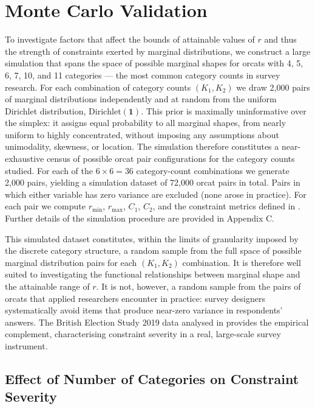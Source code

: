 \documentclass[
  12pt,
]{article}
\theoremstyle{plain}
\theoremstyle{definition}
\theoremstyle{remark}
\begin{document}
\section{Monte Carlo Validation}\label{sec-MCsim}

To investigate factors that affect the bounds of attainable values of
\(r\) and thus the strength of constraints exerted by marginal
distributions, we construct a large simulation that spans the space of
possible marginal shapes for orcats with 4, 5, 6, 7, 10, and 11
categories --- the most common category counts in survey research. For
each combination of category counts \((K_1, K_2)\) we draw 2,000 pairs
of marginal distributions independently and at random from the uniform
Dirichlet distribution, \(\text{Dirichlet}(\mathbf{1})\). This prior is
maximally uninformative over the simplex: it assigns equal probability
to all marginal shapes, from nearly uniform to highly concentrated,
without imposing any assumptions about unimodality, skewness, or
location. The simulation therefore constitutes a near-exhaustive census
of possible orcat pair configurations for the category counts studied.
For each of the \(6 \times 6 = 36\) category-count combinations we
generate 2,000 pairs, yielding a simulation dataset of 72,000 orcat
pairs in total. Pairs in which either variable has zero variance are
excluded (none arose in practice). For each pair we compute
\(r_{\min}\), \(r_{\max}\), \(C_1\), \(C_2\), and the constraint metrics
defined in . Further details of the simulation
procedure are provided in Appendix C.

This simulated dataset constitutes, within the limits of granularity
imposed by the discrete category structure, a random sample from the
full space of possible marginal distribution pairs for each
\((K_1, K_2)\) combination. It is therefore well suited to investigating
the functional relationships between marginal shape and the attainable
range of \(r\). It is not, however, a random sample from the pairs of
orcats that applied researchers encounter in practice: survey designers
systematically avoid items that produce near-zero variance in
respondents' answers. The British Election Study 2019 data analysed in
 provides the empirical complement, characterising
constraint severity in a real, large-scale survey instrument.

\subsection{Effect of Number of Categories on Constraint
Severity}\label{effect-of-number-of-categories-on-constraint-severity}
\end{document}
